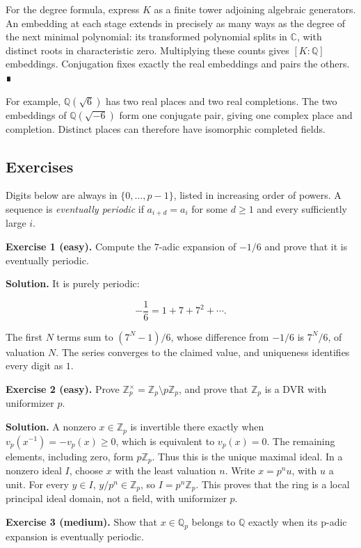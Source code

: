 \documentclass[
  english,
  11pt,
  a4paper,
]{article}
\begin{document}
For the degree formula, express \(K\) as a finite tower adjoining
algebraic generators. An embedding at each stage extends in precisely as
many ways as the degree of the next minimal polynomial: its transformed
polynomial splits in \(\mathbb C\), with distinct roots in
characteristic zero. Multiplying these counts gives \([K:\mathbb Q]\)
embeddings. Conjugation fixes exactly the real embeddings and pairs the
others. ∎

For example, \(\mathbb Q(\sqrt6)\) has two real places and two real
completions. The two embeddings of \(\mathbb Q(\sqrt{-6})\) form one
conjugate pair, giving one complex place and completion. Distinct places
can therefore have isomorphic completed fields.

\subsection{Exercises}\label{NT-LOC-02--exercises}

Digits below are always in \(\{0,\ldots,p-1\}\), listed in increasing
order of powers. A sequence is \emph{eventually periodic} if
\(a_{i+d}=a_i\) for some \(d\ge1\) and every sufficiently large \(i\).

\textbf{Exercise 1 (easy).} Compute the \(7\)-adic expansion of \(-1/6\)
and prove that it is eventually periodic.

\textbf{Solution.} It is purely periodic:

\[-\frac16=1+7+7^2+\cdots.\]

The first \(N\) terms sum to \((7^N-1)/6\), whose difference from
\(-1/6\) is \(7^N/6\), of valuation \(N\). The series converges to the
claimed value, and uniqueness identifies every digit as \(1\).

\textbf{Exercise 2 (easy).} Prove
\(\mathbb Z_p^{\times}=\mathbb Z_p\setminus p\mathbb Z_p\), and prove
that \(\mathbb Z_p\) is a DVR with uniformizer \(p\).

\textbf{Solution.} A nonzero \(x\in\mathbb Z_p\) is invertible there
exactly when \(v_p(x^{-1})=-v_p(x)\ge0\), which is equivalent to
\(v_p(x)=0\). The remaining elements, including zero, form
\(p\mathbb Z_p\). Thus this is the unique maximal ideal. In a nonzero
ideal \(I\), choose \(x\) with the least valuation \(n\). Write
\(x=p^nu\), with \(u\) a unit. For every \(y\in I\),
\(y/p^n\in\mathbb Z_p\), so \(I=p^n\mathbb Z_p\). This proves that the
ring is a local principal ideal domain, not a field, with uniformizer
\(p\).

\textbf{Exercise 3 (medium).} Show that \(x\in\mathbb Q_p\) belongs to
\(\mathbb Q\) exactly when its p-adic expansion is eventually periodic.
\end{document}
